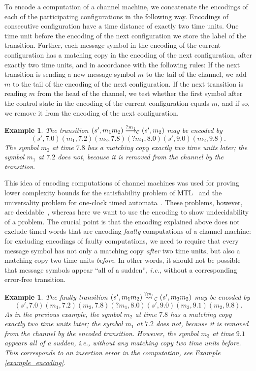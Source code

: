 \documentclass{CSML}
\theoremstyle{plain}\newtheorem{theorem}[thm]{Theorem}
\theoremstyle{plain}\newtheorem{corollary}[thm]{Corollary}
\theoremstyle{plain}\newtheorem{example}[thm]{Example}
\theoremstyle{plain}\newtheorem{lemma}[thm]{Lemma}
\theoremstyle{plain}\newtheorem{remark}[thm]{Remark}
\newcommand*\ie{\textit{i.e.}}
\newcommand{\cm}{\mathcal{C}}
\begin{document}
To encode a computation of a channel machine, we concatenate the encodings of each of the participating configurations in the following way. 
Encodings of consecutive configuration have a time distance of exactly two time units. 
One time unit before the encoding of the next configuration we store the label of the transition. 
Further, each message symbol in the encoding of the current configuration has a matching copy in the encoding of the next configuration,  after exactly two time units, and in accordance with the following rules: If the next transition is sending a new message symbol $m$ to the tail of the channel, we add $m$ to the tail of the encoding of the next configuration. 
If the next transition is reading $m$ from the head of the channel, we test whether the first symbol after the control state in the encoding of the current configuration equals $m$, and if so, we remove it from the encoding of the next configuration.  
\begin{example}
	The transition $(s',m_1m_2)\buildrel ?m_1\over\longrightarrow_\cm(s',m_2)$ 
 may be encoded by $$(s',7.0)(m_1,7.2)(m_2,7.8)(?m_1,8.0)(s',9.0)(m_2,9.8).$$ 
 The symbol $m_2$ at time $7.8$  has a matching copy exactly two time units later; the symbol $m_1$ at $7.2$ does not, because it is removed from the channel by the transition. 
\end{example}
This idea of encoding computations of channel machines was used for proving lower complexity bounds for the satisfiability problem of MTL~\cite{DBLP:conf/lics/OuaknineW05} and the universality problem for one-clock timed automata~\cite{DBLP:journals/fuin/AbdullaDOQW08}. 
These problems, however, are decidable~\cite{DBLP:conf/lics/OuaknineW05,DBLP:journals/fuin/AbdullaDOQW08}, whereas here we want to use the encoding to show undecidability of a problem. The crucial point is that the encoding explained above does not exclude timed words that are encoding \emph{faulty} computations of a channel machine: for excluding encodings of faulty computations, we need to require that every message symbol has not only a matching copy \emph{after} two time units, but also a matching copy two time units \emph{before}. In other words, it should not be possible that message symbols appear ``all of a sudden'', \ie, without a corresponding error-free transition.
\begin{example}
	The faulty transition $(s',m_1m_2)\buildrel ?m_1\over\leadsto_\cm(s',m_3m_2)$ 
	may be encoded by $$(s',7.0)(m_1,7.2)(m_2,7.8)(?m_1,8.0)(s',9.0)(m_3,9.1)(m_2,9.8).$$ 
	As in the previous example, the symbol $m_2$ at time $7.8$  has a matching copy exactly two time units later; the symbol $m_1$ at $7.2$ does not, because it is removed from the channel by the encoded transition. 
	However, the symbol $m_3$ at time $9.1$ appears all of a sudden, \ie, without any matching copy two time units before.
 This corresponds to an insertion error in the computation, see Example \ref{example_encoding}. 
\end{example}
\end{document}
